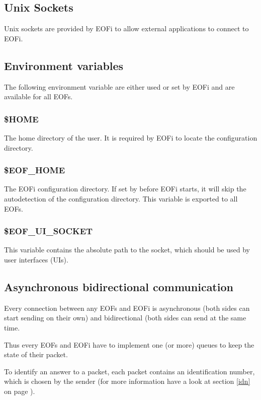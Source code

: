 \documentclass[12pt,a4paper]{book}
\begin{document}
\subsection{Unix Sockets}
Unix sockets are provided by EOFi to allow external applications to
connect to EOFi.
\subsection{Environment variables}
The following environment variable are either used or set by EOFi and are
available for all EOFs.
\subsubsection{\$HOME}
The home directory of the user. It is required by EOFi to locate the
configuration directory.
\subsubsection{\$EOF\_HOME}
The EOFi configuration directory. If set by before EOFi starts, it will
skip the autodetection of the configuration directory.
This variable is exported to all EOFs.
\subsubsection{\$EOF\_UI\_SOCKET}
This variable contains the absolute path to the socket, which should be used
by user interfaces (UIs).
\subsection{Asynchronous bidirectional communication}
Every connection between any EOFs and EOFi is asynchronous (both sides
can start sending on their own) and bidirectional (both sides can send
at the same time.

Thus every EOFs and EOFi have to implement one (or more) queues to
keep the state of their packet.

To identify an answer to a packet, each packet contains an
identification number, which is chosen by the sender
(for more information have a look at section \ref{idn} on
page \pageref{idn}).
\end{document}
